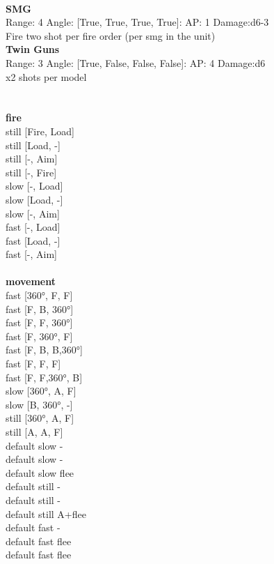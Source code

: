 \ \\
{\bf SMG } \\



Range: 4  Angle: [True, True, True, True]: AP: 1 Damage:d6-3 \\
Fire two shot per fire order (per smg in the unit)\\ 




{\bf Twin Guns } \\



Range: 3  Angle: [True, False, False, False]: AP: 4 Damage:d6 \\
x2 shots per model\\ 




 
\ \\



\ \\ {\bf fire } \\
still [Fire, Load] \\
still [Load, -] \\
still [-, Aim] \\
still [-, Fire] \\
slow [-, Load] \\
slow [Load, -] \\
slow [-, Aim] \\
fast [-, Load] \\
fast [Load, -] \\
fast [-, Aim] \\
\ \\ {\bf movement } \\
fast [360°, F, F] \\
fast [F, B, 360°] \\
fast [F, F, 360°] \\
fast [F, 360°, F] \\
fast [F, B, B,360°] \\
fast [F, F, F] \\
fast [F, F,360°, B] \\
slow [360°, A, F] \\
slow [B, 360°, -] \\
still [360°, A, F] \\
still [A, A, F] \\
default slow - \\
default slow - \\
default slow flee \\
default still - \\
default still - \\
default still A+flee \\
default fast - \\
default fast flee \\
default fast flee \\



